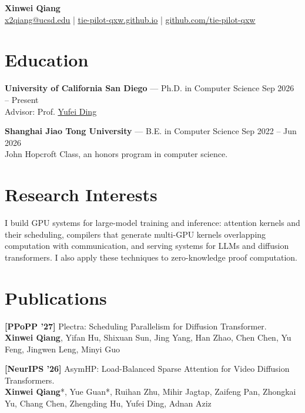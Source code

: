 \documentclass[10pt, letterpaper]{article}
\newcommand{\cvulink}[2]{\underline{\href{#1}{#2}}}
\newcommand{\pubsep}{\vspace{3pt}}
\newcommand{\entrysep}{\vspace{4pt}}
\newcommand{\venue}[1]{\textbf{[#1]}}
\begin{document}
{\LARGE \textbf{Xinwei Qiang}}\\[4pt]

\cvulink{mailto:x2qiang@ucsd.edu}{x2qiang@ucsd.edu}
\;|\;
\cvulink{https://tie-pilot-qxw.github.io/}{tie-pilot-qxw.github.io}
\;|\;
\cvulink{https://github.com/tie-pilot-qxw}{github.com/tie-pilot-qxw}

\section{Education}

\textbf{University of California San Diego}
— Ph.D. in Computer Science
\hfill Sep 2026 -- Present\\
Advisor:
Prof. \cvulink{https://sites.google.com/ucsd.edu/yufeiding}{Yufei Ding}

\entrysep

\textbf{Shanghai Jiao Tong University}
— B.E. in Computer Science
\hfill Sep 2022 -- Jun 2026\\
John Hopcroft Class, an honors program in computer science.

\section{Research Interests}

I build GPU systems for large-model training and inference:
attention kernels and their scheduling,
compilers that generate multi-GPU kernels overlapping computation with communication,
and serving systems for LLMs and diffusion transformers.
I also apply these techniques to zero-knowledge proof computation.

\section{Publications}

\venue{PPoPP '27}
Plectra: Scheduling Parallelism for Diffusion Transformer.\\
\textbf{Xinwei Qiang}, Yifan Hu, Shixuan Sun, Jing Yang, Han Zhao,
Chen Chen, Yu Feng, Jingwen Leng, Minyi Guo

\pubsep

\venue{NeurIPS '26}
AsymHP: Load-Balanced Sparse Attention for Video Diffusion Transformers.\\
\textbf{Xinwei Qiang}*, Yue Guan*, Ruihan Zhu, Mihir Jagtap,
Zaifeng Pan, Zhongkai Yu, Chang Chen, Zhengding Hu,
Yufei Ding, Adnan Aziz
\end{document}
